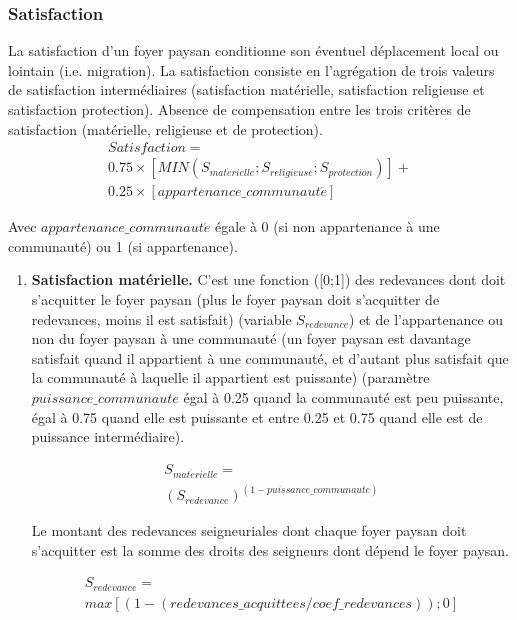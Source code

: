 \documentclass[a4paper,11pt]{article}
\begin{document}
{\subsubsection{Satisfaction}
La satisfaction d'un foyer paysan conditionne son éventuel déplacement local ou lointain (i.e. migration). La satisfaction consiste en l'agrégation de trois valeurs de satisfaction intermédiaires (satisfaction matérielle, satisfaction religieuse et satisfaction protection). Absence de compensation entre les trois critères de satisfaction (matérielle, religieuse et de protection).
\begin{equation}
\begin{gathered}
Satisfaction =\\0.75 \times [MIN (S_{mat\acute{e}rielle} ; S_ {religieuse}; S_{protection})] +\\0.25 \times [appartenance\_communaut\acute{e}]
\end{gathered}
\end{equation}

Avec $appartenance\_communaut\acute{e}$ égale à 0 (si non appartenance à une communauté) ou 1 (si appartenance).

\begin{enumerate}
  \item \textbf{Satisfaction matérielle.} 
  C'est une fonction ([0;1]) des redevances dont doit s'acquitter le foyer paysan (plus le foyer paysan doit s'acquitter de redevances, moins il est satisfait) (variable $S_{redevance}$) et de l'appartenance ou non du foyer paysan à une communauté (un foyer paysan est davantage satisfait quand il appartient à une communauté, et d'autant plus satisfait que la communauté à laquelle il appartient est puissante) (paramètre $puissance\_communaute$ égal à 0.25 quand la communauté est peu puissante, égal à 0.75 quand elle est puissante et entre 0.25 et 0.75 quand elle est de puissance intermédiaire).


\begin{equation}\label{eq:Smat}
\begin{gathered}
S_{mat\acute{e}rielle} =\\(S_{redevance})^{(1-puissance\_communaute)}
\end{gathered}
\end{equation}
  
Le montant des redevances seigneuriales dont chaque foyer paysan doit s'acquitter est la somme des droits des seigneurs dont dépend le foyer paysan.

\begin{equation}
\begin{gathered}
S_{redevance} =\\ max [ (1- (redevances\_acquittees / coef\_redevances)) ; 0]
\end{gathered}
\end{equation}


\end{enumerate}}
\end{document}
